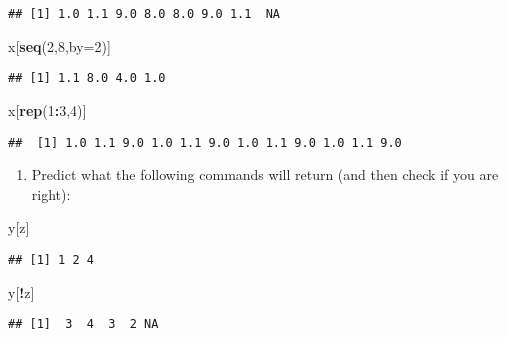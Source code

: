 \documentclass[]{article}
\newenvironment{Shaded}{\begin{snugshade}}{\end{snugshade}}
\newcommand{\KeywordTok}[1]{\textcolor[rgb]{0.13,0.29,0.53}{\textbf{#1}}}
\newcommand{\DataTypeTok}[1]{\textcolor[rgb]{0.13,0.29,0.53}{#1}}
\newcommand{\DecValTok}[1]{\textcolor[rgb]{0.00,0.00,0.81}{#1}}
\newcommand{\OperatorTok}[1]{\textcolor[rgb]{0.81,0.36,0.00}{\textbf{#1}}}
\newcommand{\NormalTok}[1]{#1}
\providecommand{\tightlist}{%
  \setlength{\itemsep}{0pt}\setlength{\parskip}{0pt}}
\begin{document}
\begin{verbatim}
## [1] 1.0 1.1 9.0 8.0 8.0 9.0 1.1  NA
\end{verbatim}

\begin{Shaded}
\begin{Highlighting}[]
\NormalTok{x[}\KeywordTok{seq}\NormalTok{(}\DecValTok{2}\NormalTok{,}\DecValTok{8}\NormalTok{,}\DataTypeTok{by=}\DecValTok{2}\NormalTok{)]}
\end{Highlighting}
\end{Shaded}

\begin{verbatim}
## [1] 1.1 8.0 4.0 1.0
\end{verbatim}

\begin{Shaded}
\begin{Highlighting}[]
\NormalTok{x[}\KeywordTok{rep}\NormalTok{(}\DecValTok{1}\OperatorTok{:}\DecValTok{3}\NormalTok{,}\DecValTok{4}\NormalTok{)]}
\end{Highlighting}
\end{Shaded}

\begin{verbatim}
##  [1] 1.0 1.1 9.0 1.0 1.1 9.0 1.0 1.1 9.0 1.0 1.1 9.0
\end{verbatim}

\begin{enumerate}
\def\labelenumi{\arabic{enumi}.}
\setcounter{enumi}{1}
\tightlist
\item
  Predict what the following commands will return (and then check if you
  are right):
\end{enumerate}

\begin{Shaded}
\begin{Highlighting}[]
\NormalTok{y[z]}
\end{Highlighting}
\end{Shaded}

\begin{verbatim}
## [1] 1 2 4
\end{verbatim}

\begin{Shaded}
\begin{Highlighting}[]
\NormalTok{y[}\OperatorTok{!}\NormalTok{z]}
\end{Highlighting}
\end{Shaded}

\begin{verbatim}
## [1]  3  4  3  2 NA
\end{verbatim}
\end{document}
